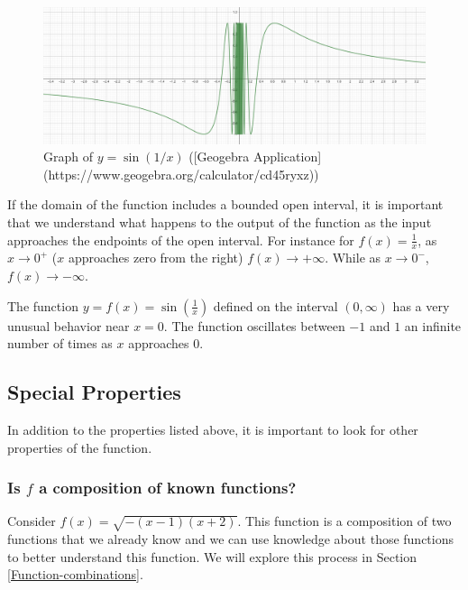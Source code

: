 \documentclass[
]{book}
\theoremstyle{definition}
\theoremstyle{definition}
\theoremstyle{definition}
\theoremstyle{definition}
\theoremstyle{remark}
\begin{document}
\begin{figure}

{\centering \includegraphics[width=0.9\linewidth]{tikz/sin-reciprical} 

}

\caption{Graph of $y=\sin(1/x)$ ([Geogebra Application](https://www.geogebra.org/calculator/cd45ryxz))}\label{fig:sin-recipricol}
\end{figure}

If the domain of the function includes a bounded open interval, it is important that we understand what happens to the output of the function as the input approaches the endpoints of the open interval. For instance for \(f(x)=\frac{1}{x}\), as \(x\rightarrow 0^+\) (\(x\) approaches zero from the right) \(f(x)\rightarrow +\infty\). While as \(x\rightarrow 0^-\), \(f(x)\rightarrow -\infty\).

The function \(y=f(x)=\sin\left(\frac{1}{x}\right)\) defined on the interval \((0,\infty)\) has a very unusual behavior near \(x=0\). The function oscillates between \(-1\) and \(1\) an infinite number of times as \(x\) approaches \(0\).

\hypertarget{special-properties}{%
\subsection{Special Properties}\label{special-properties}}

In addition to the properties listed above, it is important to look for other properties of the function.

\hypertarget{is-f-a-composition-of-known-functions}{%
\subsubsection*{\texorpdfstring{Is \(f\) a composition of known functions?}{Is f a composition of known functions?}}\label{is-f-a-composition-of-known-functions}}

Consider \(f(x)=\sqrt{-(x-1)(x+2)}\). This function is a composition of two functions that we already know and we can use knowledge about those functions to better understand this function. We will explore this process in Section \ref{Function-combinations}.
\end{document}
